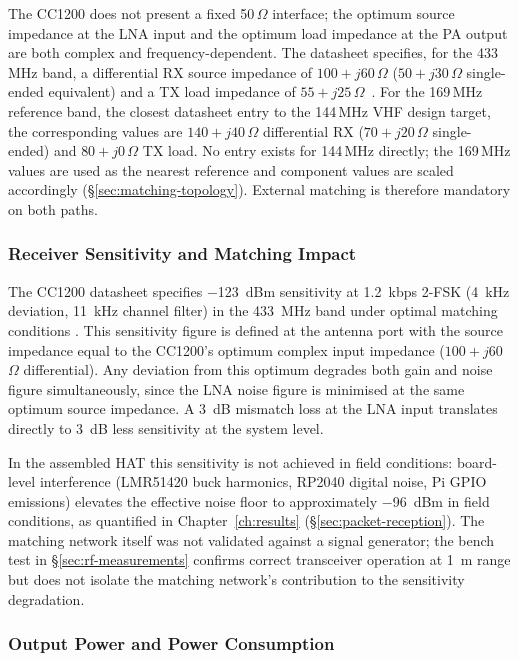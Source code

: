 The CC1200 does not present a fixed 50\,$\Omega$ interface; the optimum source impedance at the LNA input and the optimum load impedance at the PA output are both complex and frequency-dependent. The datasheet specifies, for the 433\,MHz band, a differential RX source impedance of $100 + j60\,\Omega$ ($50 + j30\,\Omega$ single-ended equivalent) and a TX load impedance of $55 + j25\,\Omega$~\cite{cc1200}. For the 169\,MHz reference band, the closest datasheet entry to the 144\,MHz VHF design target, the corresponding values are $140 + j40\,\Omega$ differential RX ($70 + j20\,\Omega$ single-ended) and $80 + j0\,\Omega$ TX load. No entry exists for 144\,MHz directly; the 169\,MHz values are used as the nearest reference and component values are scaled accordingly (\S\ref{sec:matching-topology}). External matching is therefore mandatory on both paths.

\subsubsection{Receiver Sensitivity and Matching Impact}

The CC1200 datasheet specifies $-$123~dBm sensitivity at 1.2~kbps 2-FSK (4~kHz deviation, 11~kHz channel filter) in the 433~MHz band under optimal matching conditions \cite{cc1200}. This sensitivity figure is defined at the antenna port with the source impedance equal to the CC1200's optimum complex input impedance ($100 + j60$~$\Omega$ differential). Any deviation from this optimum degrades both gain and noise figure simultaneously, since the LNA noise figure is minimised at the same optimum source impedance. A 3~dB mismatch loss at the LNA input translates directly to 3~dB less sensitivity at the system level.

In the assembled HAT this sensitivity is not achieved in field conditions: board-level interference (LMR51420 buck harmonics, RP2040 digital noise, Pi GPIO emissions) elevates the effective noise floor to approximately $-$96~dBm in field conditions, as quantified in Chapter~\ref{ch:results} (\S\ref{sec:packet-reception}). The matching network itself was not validated against a signal generator; the bench test in \S\ref{sec:rf-measurements} confirms correct transceiver operation at 1~m range but does not isolate the matching network's contribution to the sensitivity degradation.

\subsubsection{Output Power and Power Consumption}

